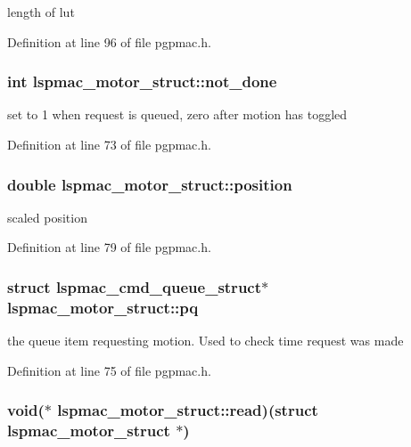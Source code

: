 length of lut 

Definition at line 96 of file pgpmac.h.\hypertarget{structlspmac__motor__struct_ab7bd8bff48953ce05c758598d75877ac}{
\subsubsection[{not\_\-done}]{\setlength{\rightskip}{0pt plus 5cm}int {\bf lspmac\_\-motor\_\-struct::not\_\-done}}}
\label{structlspmac__motor__struct_ab7bd8bff48953ce05c758598d75877ac}


set to 1 when request is queued, zero after motion has toggled 

Definition at line 73 of file pgpmac.h.\hypertarget{structlspmac__motor__struct_af8ffb3aed907d8664b65b37601954411}{
\subsubsection[{position}]{\setlength{\rightskip}{0pt plus 5cm}double {\bf lspmac\_\-motor\_\-struct::position}}}
\label{structlspmac__motor__struct_af8ffb3aed907d8664b65b37601954411}


scaled position 

Definition at line 79 of file pgpmac.h.\hypertarget{structlspmac__motor__struct_ae0a0c9264f49f51bf72168c3b62f8723}{
\subsubsection[{pq}]{\setlength{\rightskip}{0pt plus 5cm}struct {\bf lspmac\_\-cmd\_\-queue\_\-struct}$\ast$ {\bf lspmac\_\-motor\_\-struct::pq}}}
\label{structlspmac__motor__struct_ae0a0c9264f49f51bf72168c3b62f8723}


the queue item requesting motion. Used to check time request was made 

Definition at line 75 of file pgpmac.h.\hypertarget{structlspmac__motor__struct_ac62692eb939c04ca35e939d1c3acfe8f}{
\subsubsection[{read}]{\setlength{\rightskip}{0pt plus 5cm}void($\ast$ {\bf lspmac\_\-motor\_\-struct::read})(struct {\bf lspmac\_\-motor\_\-struct} $\ast$)}}
\label{structlspmac__motor__struct_ac62692eb939c04ca35e939d1c3acfe8f}


